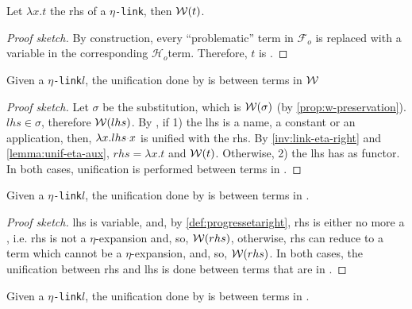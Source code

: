 \documentclass[sigconf,natbib=false,review]{acmart}
\newcommand{\appsep}{\ensuremath{\textcolor{lightgray}{\cdot}}}
\newcommand{\linkMacro}[1]{\ensuremath{#1}\texttt{-link}\xspace}
\newcommand{\linketa} {\linkMacro{\eta}}
\newcommand{\Fo}{\texorpdfstring{\ensuremath{\mathcal{F}_{\!o}\xspace}}{Fo}} %
\newcommand{\Ho}{\texorpdfstring{\ensuremath{\mathcal{H}_o}\xspace}{Ho}}
\newcommand{\lhs}{lhs\xspace}
\newcommand{\rhs}{rhs\xspace}
\begin{document}
\begin{lemma}
  Let $\lambda x.t$ the \rhs of a \linketa, then $\mathcal{W}(t)$.
  \label{lemma:unif-eta-aux}
\end{lemma}

\begin{proof}[Proof sketch]
  By construction, every ``problematic'' term in \Fo{} is replaced with a variable
  in the corresponding \Ho term. Therefore, $t$ is \wellb.
\end{proof}

\begin{lemma}
  Given a \linketa $l$, the unification done by \progressetaleft is between
  terms in $\mathcal{W}$  
  \label{lemma:unif-eta-1}
\end{lemma}

\begin{proof}[Proof sketch]
  Let $\sigma$ be the substitution, which is  $\mathcal{W}(\sigma)$ (by
  \cref{prop:w-preservation}). $\lhs \in \sigma$, therefore $\wellb(\lhs)$. By
  \progressetaleft, if 1) the \lhs is a name, a constant or an
  application, then, $\lambda x.\lhs \appsep x$ is unified with the \rhs. By
  \cref{inv:link-eta-right} and \cref{lemma:unif-eta-aux},
  $\rhs = \lambda x. t$ and $\mathcal{W}(t)$.
  Otherwise, 2) the \lhs has  as functor.
  In both cases, unification is
  performed between terms in \wellb.
\end{proof}

\begin{lemma}
  Given a \linketa $l$, the unification done by \progressetaright is between
  terms in \wellb.
  \label{lemma:unif-eta-2}
\end{lemma}

\begin{proof}[Proof sketch]
  \lhs is variable, and, by \cref{def:progressetaright}, \rhs is either no more
  a \maybeeta, i.e. \rhs is not a $\eta$-expansion and, so, $\wellb(\rhs)$,
  otherwise, \rhs can reduce to a term which cannot be a $\eta$-expansion, and,
  so, $\wellb(\rhs)$. In both cases, the unification between \rhs and \lhs
  is done between terms that are in \wellb.
\end{proof}

\begin{lemma}
  Given a \linketa $l$, the unification done by \progressetadedup is between
  terms in \wellb.
  \label{lemma:unif-eta-3}
\end{lemma}
\end{document}
